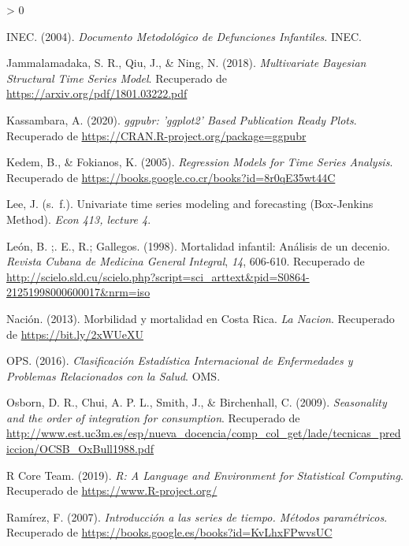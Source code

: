 \documentclass[
]{article}
\newlength{\cslhangindent}
\newenvironment{CSLReferences}[2] %
 {%
  \setlength{\parindent}{0pt}
  \ifodd #1 \everypar{\setlength{\hangindent}{\cslhangindent}}\ignorespaces\fi
  \ifnum #2 > 0
  \setlength{\parskip}{#2\baselineskip}
  \fi
 }%
 {}
\begin{document}
\begin{CSLReferences}{1}{0}
\leavevmode\hypertarget{ref-infantiles}{}%
INEC. (2004). \emph{Documento Metodológico de Defunciones Infantiles}.
INEC.

\leavevmode\hypertarget{ref-bayes}{}%
Jammalamadaka, S. R., Qiu, J., \& Ning, N. (2018). \emph{Multivariate
Bayesian Structural Time Series Model}. Recuperado de
\url{https://arxiv.org/pdf/1801.03222.pdf}

\leavevmode\hypertarget{ref-ggpubr}{}%
Kassambara, A. (2020). \emph{ggpubr: 'ggplot2' Based Publication Ready
Plots}. Recuperado de \url{https://CRAN.R-project.org/package=ggpubr}

\leavevmode\hypertarget{ref-kedem}{}%
Kedem, B., \& Fokianos, K. (2005). \emph{Regression Models for Time
Series Analysis}. Recuperado de
\url{https://books.google.co.cr/books?id=8r0qE35wt44C}

\leavevmode\hypertarget{ref-Lee}{}%
Lee, J. (s.~f.). Univariate time series modeling and forecasting
(Box-Jenkins Method). \emph{Econ 413, lecture 4}.

\leavevmode\hypertarget{ref-leon}{}%
León, B. ;. E., R.; Gallegos. (1998). {Mortalidad infantil: Análisis de
un decenio}. \emph{{Revista Cubana de Medicina General Integral}},
\emph{14}, 606-610. Recuperado de
\url{http://scielo.sld.cu/scielo.php?script=sci_arttext\&pid=S0864-21251998000600017\&nrm=iso}

\leavevmode\hypertarget{ref-nacion}{}%
Nación. (2013). Morbilidad y mortalidad en Costa Rica. \emph{La Nacion}.
Recuperado de \url{https://bit.ly/2xWUeXU}

\leavevmode\hypertarget{ref-CIE10}{}%
OPS. (2016). \emph{Clasificación Estadística Internacional de
Enfermedades y Problemas Relacionados con la Salud}. OMS.

\leavevmode\hypertarget{ref-Osborn2009SEASONALITYAT}{}%
Osborn, D. R., Chui, A. P. L., Smith, J., \& Birchenhall, C. (2009).
\emph{Seasonality and the order of integration for consumption}.
Recuperado de
\url{http://www.est.uc3m.es/esp/nueva_docencia/comp_col_get/lade/tecnicas_prediccion/OCSB_OxBull1988.pdf}

\leavevmode\hypertarget{ref-parallel}{}%
R Core Team. (2019). \emph{R: A Language and Environment for Statistical
Computing}. Recuperado de \url{https://www.R-project.org/}

\leavevmode\hypertarget{ref-introduccion_series}{}%
Ramírez, F. (2007). \emph{Introducción a las series de tiempo. Métodos
paramétricos}. Recuperado de
\url{https://books.google.es/books?id=KvLhxFPwvsUC}


\end{CSLReferences}
\end{document}
